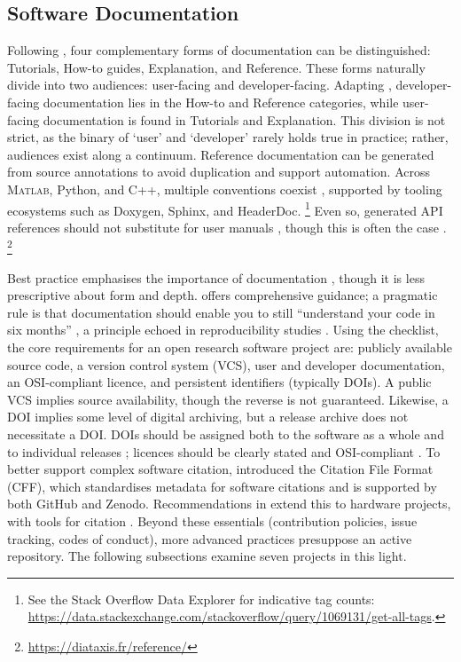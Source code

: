 \subsection{Software Documentation}

Following \textcite{procida_diataxis_2025}, four complementary forms of
documentation can be distinguished: Tutorials, How-to guides, Explanation, and
Reference. These forms naturally divide into two audiences: user-facing and
developer-facing. Adapting \textcite{procida_diataxis_2025}, developer-facing
documentation lies in the How-to and Reference categories, while user-facing
documentation is found in Tutorials and Explanation. This division is not
strict, as the binary of `user' and `developer' rarely holds true in practice;
rather, audiences exist along a continuum. Reference documentation can be
generated from source annotations to avoid duplication and support automation.
Across M\textsc{atlab}, Python, and C\textsc{++}, multiple conventions coexist
\cite{vanrossum_pep8_2001, goodger_pep257_2001}, supported by tooling ecosystems
such as Doxygen, Sphinx, and HeaderDoc.%
\footnote{See the Stack Overflow Data Explorer for indicative tag counts:
\url{https://data.stackexchange.com/stackoverflow/query/1069131/get-all-tags}.}
Even so, generated API references should not substitute for user manuals
\cite[Section~6.2]{stallman_gnu_1992}, though this is often the case
\cite{procida_diataxis_2025}.%
\footnote{\url{https://diataxis.fr/reference/}}

Best practice emphasises the importance of documentation
\cite{smith_software_2016}, though it is less prescriptive about form and depth.
\textcite{writethedocs_sowftware_2025} offers comprehensive guidance; a
pragmatic rule is that documentation should enable you to still ``understand
your code in six months'' \cite{writethedocs_sowftware_2025}, a principle echoed
in reproducibility studies \cite{perkel_challenge_2020}. Using the
\citep{ssi_checklist_2018} checklist, the core requirements for an open research
software project are: publicly available source code, a version control system
(VCS), user and developer documentation, an OSI-compliant licence, and
persistent identifiers (typically DOIs). A public VCS implies source
availability, though the reverse is not guaranteed. Likewise, a DOI implies some
level of digital archiving, but a release archive does not necessitate a DOI.
DOIs should be assigned both to the software as a whole and to individual
releases \cite{smith_software_2016}; licences should be clearly stated and
OSI-compliant \cite{hong_choosing_2025}. To better support complex software
citation, \textcite{druskat_citation_2021} introduced the Citation File Format
(CFF), which standardises metadata for software citations and is supported by
both GitHub and Zenodo. Recommendations in \textcite{fiordelmondo_towards_2025}
extend this to hardware projects, with tools for citation
\cite{spaaks_cffconvert_2021}. Beyond these essentials (contribution policies,
issue tracking, codes of conduct), more advanced practices presuppose an active
repository. The following subsections examine seven projects in this light.

